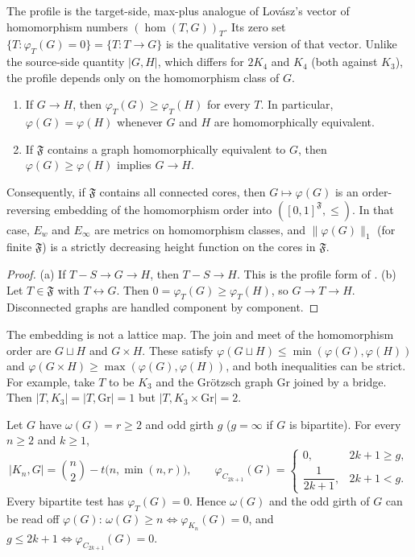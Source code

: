 The profile is the target-side, max-plus analogue of Lov\'asz's vector of
homomorphism numbers $(\hom(T,G))_T$.  Its zero set
$\{T:\varphi_T(G)=0\}=\{T: T\to G\}$ is the qualitative version of that vector.
Unlike the source-side quantity $|G,H|$, which differs for $2K_4$ and $K_4$
(both against $K_3$), the profile depends only on the homomorphism class of
$G$.

\begin{proposition}
\label{prop:profile_order}
\begin{enumerate}
\item[(a)] If $G\to H$, then $\varphi_T(G)\ge\varphi_T(H)$ for every $T$.
      In particular, $\varphi(G)=\varphi(H)$ whenever $G$ and $H$ are
      homomorphically equivalent.
\item[(b)] If $\mathfrak F$ contains a graph homomorphically equivalent to
      $G$, then $\varphi(G)\ge\varphi(H)$ implies $G\to H$.
\end{enumerate}
Consequently, if $\mathfrak F$ contains all connected cores, then $G\mapsto\varphi(G)$
is an order-reversing embedding of the homomorphism order into
$([0,1]^{\mathfrak F},\le)$.  In that case, $E_w$ and $E_\infty$ are metrics on
homomorphism classes, and $\|\varphi(G)\|_1$ (for finite $\mathfrak F$) is a
strictly decreasing height function on the cores in $\mathfrak F$.
\end{proposition}

\begin{proof}
(a) If $T-S\to G\to H$, then $T-S\to H$.  This is the profile form of
\cite[Lemma~2.6]{efjt2015}.
(b) Let $T\in\mathfrak F$ with $T\leftrightarrow G$.  Then
$0=\varphi_T(G)\ge\varphi_T(H)$, so $G\to T\to H$.
Disconnected graphs are handled component by component.
\end{proof}

The embedding is not a lattice map.  The join and meet of the
homomorphism order are $G\sqcup H$ and $G\times H$.  These satisfy
$\varphi(G\sqcup H)\le\min(\varphi(G),\varphi(H))$ and
$\varphi(G\times H)\ge\max(\varphi(G),\varphi(H))$, and both inequalities can
be strict.  For example, take $T$ to be $K_3$ and the Gr\"otzsch graph $\mathrm{Gr}$
joined by a bridge.  Then $|T,K_3|=|T,\mathrm{Gr}|=1$ but
$|T,K_3\times\mathrm{Gr}|=2$.

\begin{proposition}
\label{prop:profile_closed}
Let $G$ have $\omega(G)=r\ge2$ and odd girth $g$ ($g=\infty$ if $G$ is
bipartite).  For every $n\ge2$ and $k\ge1$,
\[
  |K_n,G|=\binom n2-t\bigl(n,\min(n,r)\bigr),\qquad
  \varphi_{C_{2k+1}}(G)=
  \begin{cases}0,&2k+1\ge g,\\[2pt] \dfrac1{2k+1},&2k+1<g.\end{cases}
\]
Every bipartite test has $\varphi_T(G)=0$.  Hence $\omega(G)$ and the odd
girth of $G$ can be read off $\varphi(G)$:
$\omega(G)\ge n\iff\varphi_{K_n}(G)=0$, and
$g\le 2k+1\iff\varphi_{C_{2k+1}}(G)=0$.
\end{proposition}

